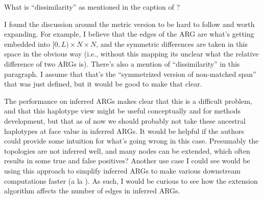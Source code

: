 \reply{
}

\begin{point}{}
 What is ``dissimilarity'' as mentioned in the caption of ?
\end{point}

\reply{
}

\begin{point}{\revref}
 I found the discussion around the metric version to be hard to follow and worth expanding.
For example, I believe that the edges of the ARG are what's getting embedded into
$[0, L) \times N \times N$, and the symmetric differences are taken in this space in the obvious way (i.e., without this mapping its unclear what the relative difference of two ARGs is).
There's also a mention of ``dissimilarity'' in this paragraph. I assume that that's the ``symmetrized version of non-matched span'' that was just defined, but it would be good to make that clear.
\end{point}

\reply{
}

\begin{point}{}
 The performance on inferred ARGs makes clear that this is a difficult problem, and that this haplotype view might be useful conceptually and for methods development, but that as of now we should probably not take these ancestral haplotypes at face value in inferred ARGs. It would be helpful if the authors could provide some intuition for what's going wrong in this case. Presumably the topologies are not inferred well, and many nodes can be extended, which often results in some true and false positives? Another use case I could see would be using this approach to simplify inferred ARGs to make various downstream computations faster (a la ). As such, I would be curious to see how the extension algorithm affects the number of edges in inferred ARGs.
\end{point}

\reply{
}

